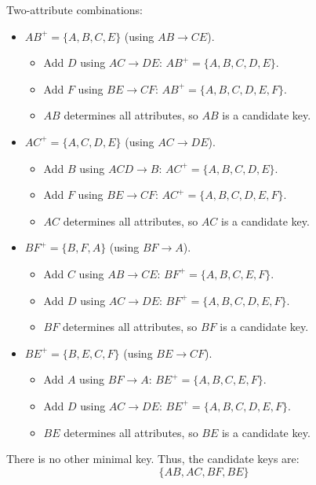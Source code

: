 \documentclass{article}
\begin{document}
Two-attribute combinations:
\begin{itemize}
  \item $ AB^+ = \{A, B, C, E\} $ (using $ AB \to CE $).
        \begin{itemize}
          \item Add $ D $ using $ AC \to DE $: $ AB^+ = \{A, B, C, D, E\} $.
          \item Add $ F $ using $ BE \to CF $: $ AB^+ = \{A, B, C, D, E, F\} $.
          \item $ AB $ determines all attributes, so $ AB $ is a candidate key.
        \end{itemize}
  \item $ AC^+ = \{A, C, D, E\} $ (using $ AC \to DE $).
        \begin{itemize}
          \item Add $ B $ using $ ACD \to B $: $ AC^+ = \{A, B, C, D, E\} $.
          \item Add $ F $ using $ BE \to CF $: $ AC^+ = \{A, B, C, D, E, F\} $.
          \item $ AC $ determines all attributes, so $ AC $ is a candidate key.
        \end{itemize}
  \item $ BF^+ = \{B, F, A\} $ (using $ BF \to A $).
        \begin{itemize}
          \item Add $ C $ using $ AB \to CE $: $ BF^+ = \{A, B, C, E, F\} $.
          \item Add $ D $ using $ AC \to DE $: $ BF^+ = \{A, B, C, D, E, F\} $.
          \item $ BF $ determines all attributes, so $ BF $ is a candidate key.
        \end{itemize}
  \item $ BE^+ = \{B, E, C, F\} $ (using $ BE \to CF $).
        \begin{itemize}
          \item Add $ A $ using $ BF \to A $: $ BE^+ = \{A, B, C, E, F\} $.
          \item Add $ D $ using $ AC \to DE $: $ BE^+ = \{A, B, C, D, E, F\} $.
          \item $ BE $ determines all attributes, so $ BE $ is a candidate key.
        \end{itemize}
\end{itemize}
There is no other minimal key. Thus, the candidate keys are:
$$
  \boxed{\{AB, AC, BF, BE\}}
$$
\end{document}

